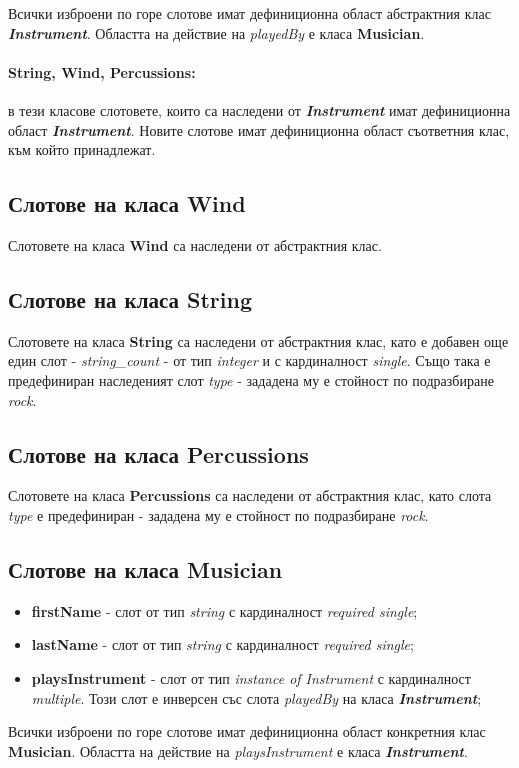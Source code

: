 \documentclass[a4paper,12pt]{article}
\begin{document}
Всички изброени по горе слотове имат дефиниционна област абстрактния клас \textbf{\textit{Instrument}}. Областта на действие на \textit{playedBy} е класа \textbf{Musician}.

\paragraph{String, Wind, Percussions:}
в тези класове слотовете, които са наследени от \textbf{\textit{Instrument}} имат дефиниционна област \textbf{\textit{Instrument}}. Новите слотове имат дефиниционна област съответния клас, към който принадлежат.

\subsection{Слотове на класа \textbf{Wind}}
Слотовете на класа \textbf{Wind} са наследени от абстрактния клас.


\subsection{Слотове на класа \textbf{String}}
Слотовете на класа \textbf{String} са наследени от абстрактния клас, като е добавен още един слот - \textit{string\_count} - от тип \textit{integer} и с кардиналност \textit{single}. Също така е предефиниран наследеният слот \textit{type} - зададена му е стойност по подразбиране \textit{rock}.

\subsection{Слотове на класа \textbf{Percussions}}
Слотовете на класа \textbf{Percussions} са наследени от абстрактния клас, като слота \textit{type} е предефиниран - зададена му е стойност по подразбиране \textit{rock}.

\subsection{Слотове на класа \textbf{Musician}}

\begin{itemize}
\item \textbf{firstName} - слот от тип \textit{string}  с кардиналност \textit{required single};
\item \textbf{lastName} - слот от тип \textit{string}  с кардиналност \textit{required single};
\item \textbf{playsInstrument} - слот от тип \textit{instance of Instrument} с кардиналност \textit{multiple}. Този слот е инверсен със слота \textit{playedBy} на класа \textbf{\textit{Instrument}};
\end{itemize}
Всички изброени по горе слотове имат дефиниционна област конкретния клас \textbf{Musician}. Областта на действие на \textit{playsInstrument} е класа \textbf{\textit{Instrument}}.
\end{document}

